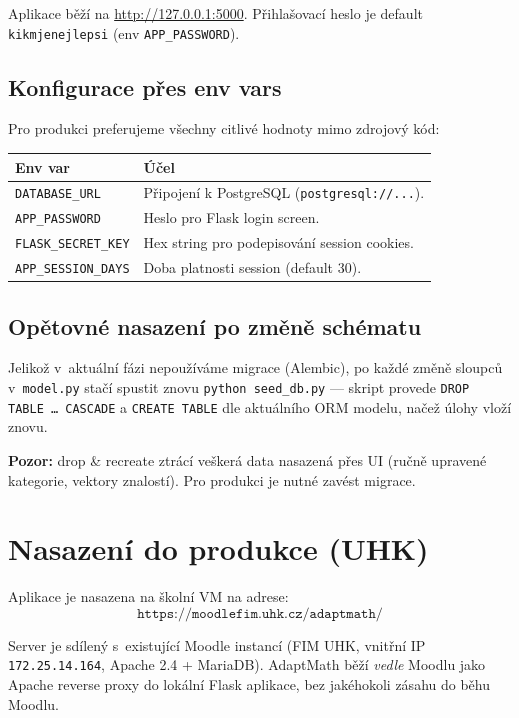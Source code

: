 \documentclass[11pt,a4paper]{article}
\begin{document}
Aplikace běží na \url{http://127.0.0.1:5000}. Přihlašovací heslo je default \texttt{kikmjenejlepsi} (env \texttt{APP\_PASSWORD}).

\subsection{Konfigurace přes env vars}

Pro produkci preferujeme všechny citlivé hodnoty mimo zdrojový kód:

\begin{tabular}{ll}
  \toprule
  \textbf{Env var} & \textbf{Účel} \\
  \midrule
  \texttt{DATABASE\_URL}       & Připojení k PostgreSQL (\texttt{postgresql://...}). \\
  \texttt{APP\_PASSWORD}       & Heslo pro Flask login screen. \\
  \texttt{FLASK\_SECRET\_KEY}  & Hex string pro podepisování session cookies. \\
  \texttt{APP\_SESSION\_DAYS}  & Doba platnosti session (default 30). \\
  \bottomrule
\end{tabular}

\subsection{Opětovné nasazení po změně schématu}

Jelikož v~aktuální fázi nepoužíváme migrace (Alembic), po každé změně sloupců v~\texttt{model.py} stačí spustit znovu \texttt{python seed\_db.py} --- skript provede \texttt{DROP TABLE \dots\ CASCADE} a \texttt{CREATE TABLE} dle aktuálního ORM modelu, načež úlohy vloží znovu.

\textbf{Pozor:} drop \& recreate ztrácí veškerá data nasazená přes UI (ručně upravené kategorie, vektory znalostí). Pro produkci je nutné zavést migrace.

\section{Nasazení do produkce (UHK)}

Aplikace je nasazena na školní VM na adrese:
\[
\boxed{\texttt{https://moodlefim.uhk.cz/adaptmath/}}
\]

Server je sdílený s~existující Moodle instancí (FIM UHK, vnitřní IP \texttt{172.25.14.164}, Apache 2.4 + MariaDB). AdaptMath běží \emph{vedle} Moodlu jako Apache reverse proxy do lokální Flask aplikace, bez jakéhokoli zásahu do běhu Moodlu.
\end{document}
